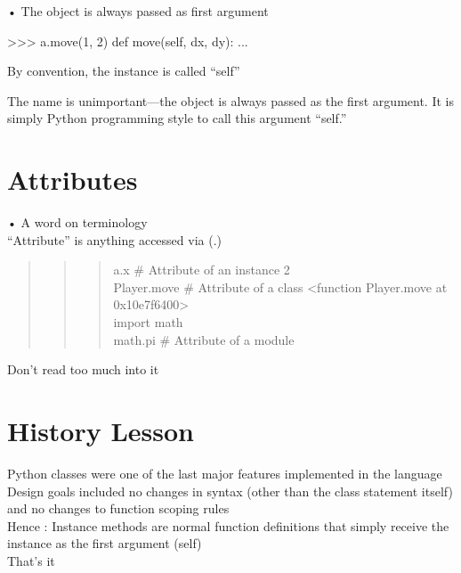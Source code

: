 \documentclass[
  letterpaper,
  DIV=11,
  numbers=noendperiod]{scrreprt}
\newenvironment{Shaded}{\begin{snugshade}}{\end{snugshade}}
\newcommand{\NormalTok}[1]{\textcolor[rgb]{0.00,0.23,0.31}{#1}}
\begin{document}
• The object is always passed as first argument

\begin{Shaded}
\begin{Highlighting}[]
\NormalTok{\textgreater{}\textgreater{}\textgreater{} a.move(1, 2) def move(self, dx, dy): ... }
\end{Highlighting}
\end{Shaded}

By convention, the instance is called ``self''

The name is unimportant---the object is always passed as the first
argument. It is simply Python programming style to call this argument
``self.''


\chapter{Attributes}\label{attributes}

• A word on terminology\\
``Attribute'' is anything accessed via (.)

\begin{quote}
\begin{quote}
\begin{quote}
a.x \# Attribute of an instance 2\\
Player.move \# Attribute of a class \textless function Player.move at
0x10e7f6400\textgreater{}\\
import math\\
math.pi \# Attribute of a module
\end{quote}
\end{quote}
\end{quote}

Don't read too much into it


\chapter{History Lesson}\label{history-lesson}

Python classes were one of the last major features implemented in the
language\\
Design goals included no changes in syntax (other than the class
statement itself) and no changes to function scoping rules\\
Hence : Instance methods are normal function definitions that simply
receive the instance as the first argument (self)\\
That's it
\end{document}
